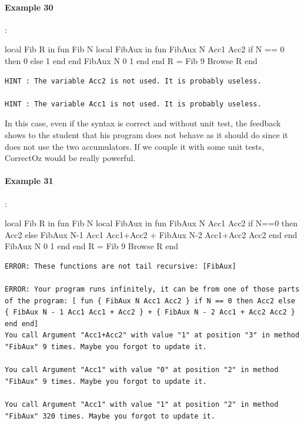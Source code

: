 \documentclass[11pt,a4paper,twoside,openright]{report}
\begin{document}
\paragraph{Example 30}:

\begin{OZ}
local Fib R in
    fun {Fib N}
        local FibAux in
            fun {FibAux N Acc1 Acc2}
				if N == 0 then 0 else 1 end
			end
        	 {FibAux N 0 1}
		end
    	end
	R = {Fib 9}
	{Browse R}
end
\end{OZ}

\begin{lstlisting}
HINT : The variable Acc2 is not used. It is probably useless.

HINT : The variable Acc1 is not used. It is probably useless.
\end{lstlisting}

In this case, even if the syntax is correct and without unit test, the feedback 
shows to the student that his program does not behave as it should do since it 
does not use the two accumulators. If we couple it with some unit 
tests, 
CorrectOz would be really powerful.


\paragraph{Example 31}:

\begin{OZ}
local Fib R in
    fun {Fib N}
        local FibAux in
            fun {FibAux N Acc1 Acc2}
				if N==0 then Acc2
				else {FibAux N-1 Acc1 Acc1+Acc2} + {FibAux N-2 Acc1+Acc2 Acc2}
				end
			end
        	 {FibAux N 0 1}
		end
    	end
	R = {Fib 9}
	{Browse R}
end
\end{OZ}

\begin{lstlisting}
ERROR: These functions are not tail recursive: [FibAux]

ERROR: Your program runs infinitely, it can be from one of those parts of the program: [ fun { FibAux N Acc1 Acc2 } if N == 0 then Acc2 else { FibAux N - 1 Acc1 Acc1 + Acc2 } + { FibAux N - 2 Acc1 + Acc2 Acc2 } end end] 
You call Argument "Acc1+Acc2" with value "1" at position "3" in method "FibAux" 9 times. Maybe you forgot to update it. 

You call Argument "Acc1" with value "0" at position "2" in method "FibAux" 9 times. Maybe you forgot to update it. 

You call Argument "Acc1" with value "1" at position "2" in method "FibAux" 320 times. Maybe you forgot to update it.
\end{lstlisting}
\end{document}
